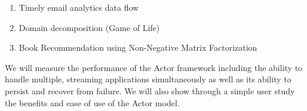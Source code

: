\documentclass[11pt,letterpaper]{article}
\begin{document}
\begin{enumerate}
	\item Timely email analytics data flow
	\item Domain decomposition (Game of Life)
	\item Book Recommendation using Non-Negative Matrix Factorization
\end{enumerate}

We will measure the performance of the Actor framework including the ability to handle multiple, streaming applications simultaneously as well as its ability to persist and recover from failure. We will also show through a simple user study the benefits and ease of use of the Actor model.



\end{document}
